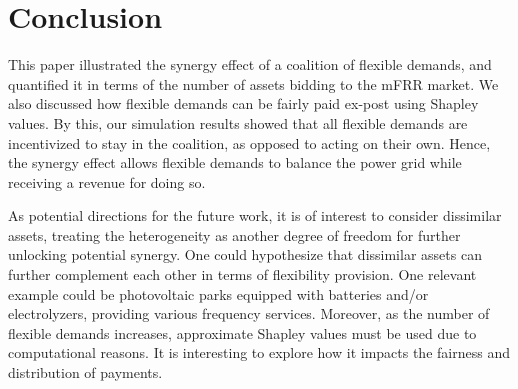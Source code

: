 \documentclass[conference]{IEEEtran}
\begin{document}
\section{Conclusion}
\label{chapter4}

This paper illustrated the synergy effect of a coalition of flexible demands, and quantified it in terms of the number of assets bidding to the mFRR market. We also discussed how flexible demands can be fairly paid ex-post using Shapley values. By this, our simulation results showed that all flexible demands are incentivized to stay in the coalition, as opposed to acting on their own. Hence, the synergy effect allows flexible demands to balance the power grid while receiving a revenue for doing so. %

As potential directions for the future work, it is of interest to consider dissimilar assets, treating the heterogeneity as another degree of freedom for further unlocking potential synergy. One could hypothesize that dissimilar assets can further complement each other in terms of flexibility provision. One relevant example could be photovoltaic parks equipped with batteries and/or electrolyzers, providing various frequency services. Moreover, as the number of flexible demands increases, approximate Shapley values must be used due to computational reasons. It is interesting to explore how it impacts the fairness and distribution of payments.


% 



\vfill
\end{document}
